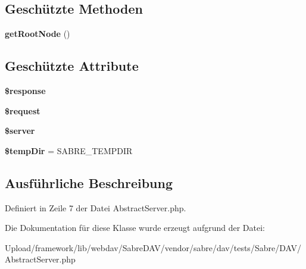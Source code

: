 \subsection*{Geschützte Methoden}
\begin{DoxyCompactItemize}
\item 
\mbox{\label{class_sabre_1_1_d_a_v_1_1_abstract_server_a940e8be038f7b04a4cac2e7e629dd0a2}} 
{\bfseries get\+Root\+Node} ()
\end{DoxyCompactItemize}
\subsection*{Geschützte Attribute}
\begin{DoxyCompactItemize}
\item 
\mbox{\label{class_sabre_1_1_d_a_v_1_1_abstract_server_ad4859caf55bb848c90056fdcff3c1a68}} 
{\bfseries \$response}
\item 
\mbox{\label{class_sabre_1_1_d_a_v_1_1_abstract_server_ae0f75a6f0b7532f1ecbbb19a3880d311}} 
{\bfseries \$request}
\item 
\mbox{\label{class_sabre_1_1_d_a_v_1_1_abstract_server_afe6d0e15bf27f83be90a071fd5ab7073}} 
{\bfseries \$server}
\item 
\mbox{\label{class_sabre_1_1_d_a_v_1_1_abstract_server_a2be46736016a0fd1304141b4f417d38f}} 
{\bfseries \$temp\+Dir} = S\+A\+B\+R\+E\+\_\+\+T\+E\+M\+P\+D\+IR
\end{DoxyCompactItemize}


\subsection{Ausführliche Beschreibung}


Definiert in Zeile 7 der Datei Abstract\+Server.\+php.



Die Dokumentation für diese Klasse wurde erzeugt aufgrund der Datei\+:\begin{DoxyCompactItemize}
\item 
Upload/framework/lib/webdav/\+Sabre\+D\+A\+V/vendor/sabre/dav/tests/\+Sabre/\+D\+A\+V/Abstract\+Server.\+php\end{DoxyCompactItemize}
